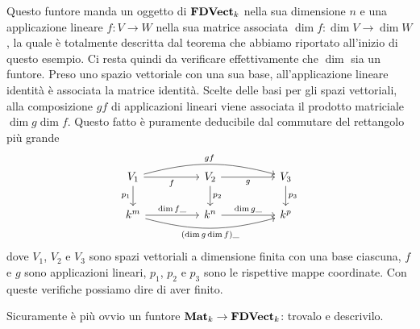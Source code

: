 \begin{esempio}
Questo funtore manda un oggetto di \(\mathbf{FDVect}_k\) nella sua dimensione \(n\) e una applicazione lineare \(f : V \to W\) nella sua matrice associata \(\dim f : \dim V \to \dim W\), la quale è totalmente descritta dal teorema che abbiamo riportato all'inizio di questo esempio. Ci resta quindi da verificare effettivamente che \(\dim\) sia un funtore. Preso uno spazio vettoriale con una sua base, all'applicazione lineare identità è associata la matrice identità. Scelte delle basi per gli spazi vettoriali, alla composizione \(gf\) di applicazioni lineari viene associata il prodotto matriciale \(\dim g \dim f\). Questo fatto è puramente deducibile dal commutare del rettangolo più grande
\[\begin{tikzcd}
V_1 \ar["f",rr,swap] \ar["p_1",d,swap] \ar["gf",rrrr,bend left=15] & &
V_2 \ar["g",rr,swap] \ar["p_2",d] & &
V_3 \ar["p_3",d] \\
k^m \ar["{\dim f\_}",rr] \ar["{(\dim g \dim f)\_}",rrrr,bend right=15,swap] & &
k^n \ar["{\dim g\_}",rr] & &
k^p
\end{tikzcd}\]
dove \(V_1\), \(V_2\) e \(V_3\) sono spazi vettoriali a dimensione finita con una base ciascuna, \(f\) e \(g\) sono applicazioni lineari, \(p_1\), \(p_2\) e \(p_3\) sono le rispettive mappe coordinate. Con queste verifiche possiamo dire di aver finito.
\end{esempio}

\begin{esercizio}
Sicuramente è più ovvio un funtore \(\mathbf{Mat}_k \to \mathbf{FDVect}_k\): trovalo e descrivilo.
\end{esercizio}

